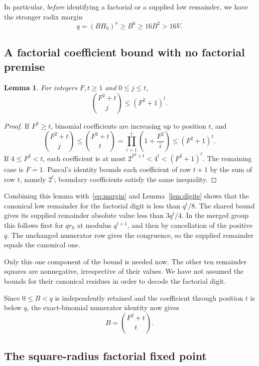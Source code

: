 \documentclass[10pt,letterpaper]{article}
\newtheorem{lemma}[theorem]{Lemma}
\theoremstyle{definition}\newtheorem{definition}[theorem]{Definition}
\begin{document}
In particular, \emph{before} identifying a factorial or a supplied low
remainder, we have the stronger radix margin
\begin{equation}\label{eq:margin}
 q=(BH_0)^x\ge B^6\ge16B^2>16V.
\end{equation}

\subsection{A factorial coefficient bound with no factorial premise}

\begin{lemma}\label{lem:factorialdigits}
For integers $F,t\ge1$ and $0\le j\le t$,
\[
 \binom{F^2+t}{j}\le(F^2+1)^t.
\]
\end{lemma}
\begin{proof}
If $F^2\ge t$, binomial coefficients are increasing up to position $t$,
and
\[
 \binom{F^2+t}{j}\le\binom{F^2+t}{t}
   =\prod_{i=1}^t\left(1+\frac{F^2}{i}\right)
   \le(F^2+1)^t.
\]
If $4\le F^2<t$, each coefficient is at most
$2^{F^2+t}<4^t<(F^2+1)^t$. The remaining case is $F=1$.
Pascal's identity bounds each coefficient of row $t+1$ by the sum of
row $t$, namely $2^t$; boundary coefficients satisfy the same inequality.
\end{proof}

Combining this lemma with~\eqref{eq:margin} and Lemma~\ref{lem:digits}
shows that the canonical low remainder for the factorial digit is less
than $q^t/8$. The shared bound gives its supplied remainder absolute value
less than $3q^t/4$. In the merged group this follows first for $q r_0$
at modulus $q^{t+1}$, and then by cancellation of the positive $q$.
The unchanged numerator row gives the congruence, so the supplied remainder
equals the canonical one.

Only this one component of the bound is needed now. The other ten
remainder squares are nonnegative, irrespective of their values. We have
not assumed the bounds for their canonical residues in order to decode
the factorial digit.

Since $0\le B<q$ is independently retained and the coefficient through
position $t$ is below $q$, the exact-binomial numerator identity now gives
\begin{equation}\label{eq:Bbinomial}
 B=\binom{F^2+t}{t}.
\end{equation}

\subsection{The square-radius factorial fixed point}
\end{document}
